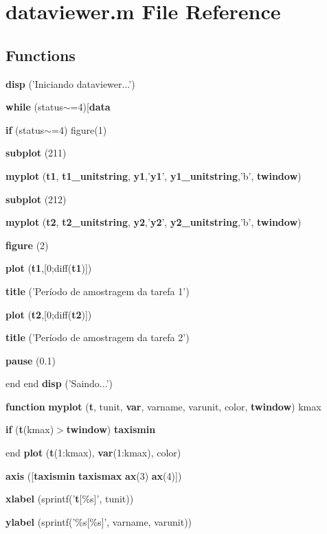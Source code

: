 \section{dataviewer.m File Reference}
\label{libs_2gdatalogger_2demo-xenomai_2matlab_2dataviewer_8m}
\subsection*{Functions}
\begin{DoxyCompactItemize}
\item 
{\bf disp} ('Iniciando dataviewer...')
\item 
{\bf while} (status$\sim$=4)[{\bf data}
\item 
{\bf if} (status$\sim$=4) figure(1)
\item 
{\bf subplot} (211)
\item 
{\bf myplot} ({\bf t1}, {\bf t1\_\-unitstring}, {\bf y1},'{\bf y1}', {\bf y1\_\-unitstring},'b', {\bf twindow})
\item 
{\bf subplot} (212)
\item 
{\bf myplot} ({\bf t2}, {\bf t2\_\-unitstring}, {\bf y2},'{\bf y2}', {\bf y2\_\-unitstring},'b', {\bf twindow})
\item 
{\bf figure} (2)
\item 
{\bf plot} ({\bf t1},[0;diff({\bf t1})])
\item 
{\bf title} ('Período de amostragem da tarefa 1')
\item 
{\bf plot} ({\bf t2},[0;diff({\bf t2})])
\item 
{\bf title} ('Período de amostragem da tarefa 2')
\item 
{\bf pause} (0.1)
\item 
end end {\bf disp} ('Saindo...')
\item 
{\bf function} {\bf myplot} ({\bf t}, tunit, {\bf var}, varname, varunit, color, {\bf twindow}) kmax
\item 
{\bf if} ({\bf t}(kmax)$>${\bf twindow}) {\bf taxismin}
\item 
end {\bf plot} ({\bf t}(1:kmax), {\bf var}(1:kmax), color)
\item 
{\bf axis} ([{\bf taxismin} {\bf taxismax} {\bf ax}(3) {\bf ax}(4)])
\item 
{\bf xlabel} (sprintf('{\bf t}[\%s]', tunit))
\item 
{\bf ylabel} (sprintf('\%s[\%s]', varname, varunit))
\end{DoxyCompactItemize}
